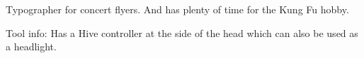 \begin{npcBox}[title=Norm: Sam]
    \begin{stressSection}
    \end{stressSection}
    \begin{tabularx}{\textwidth}{ XX }
    \end{tabularx}

    \begin{consequences}
    \item {}
    \item {}
    \item {}
    \end{consequences}

    \begin{npcDescription}

    Typographer for concert flyers. And has plenty of time for the Kung Fu hobby.

    Tool info: Has a Hive controller at the side of the head which can also be used as a headlight.

    \end{npcDescription}

\end{npcBox}

\newpage

